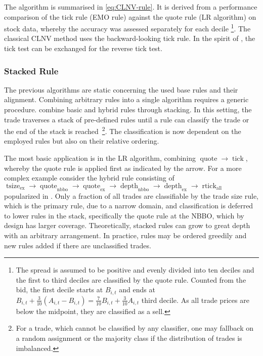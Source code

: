 The algorithm is summarised in \cref{eq:CLNV-rule}. It is derived from a performance comparison of the tick rule (\gls{EMO} rule) against the quote rule (\gls{LR} algorithm) on stock data, whereby the accuracy was assessed separately for each decile \footnote{The spread is assumed to be positive and evenly divided into ten deciles and the first to third deciles are classified by the quote rule. Counted from the bid, the first decile starts at $B_{i,t}$ and ends at $B_{i,t} + \tfrac{3}{10} (A_{i,t} - B_{i,t}) = \tfrac{7}{10} B_{i,t} + \tfrac{3}{10} A_{i,t}$ third decile. As all trade prices are below the midpoint, they are classified as a sell.}. The classical \gls{CLNV} method uses the backward-looking tick rule. In the spirit of \textcite[][735]{leeInferringTradeDirection1991}, the tick test can be exchanged for the reverse tick test.

\subsubsection{Stacked Rule}\label{sec:stacked-rule}

The previous algorithms are static concerning the used base rules and their alignment. Combining arbitrary rules into a single algorithm requires a generic procedure. \textcite[][18]{grauerOptionTradeClassification2022} combine basic and hybrid rules through stacking. In this setting, the trade traverses a stack of pre-defined rules until a rule can classify the trade or the end of the stack is reached~\footnote{For a trade, which cannot be classified by any classifier, one may fallback on a random assignment or the majority class if the distribution of trades is imbalanced.}. The classification is now dependent on the employed rules but also on their relative ordering.

The most basic application is in the \gls{LR} algorithm, combining $\operatorname{quote} \to \operatorname{tick}$, whereby the quote rule is applied first as indicated by the arrow. For a more complex example consider the hybrid rule consisting of $\operatorname{tsize}_{\mathrm{ex}} \to \operatorname{quote}_{\mathrm{nbbo}} \to \operatorname{quote}_{\mathrm{ex}} \to \operatorname{depth}_{\mathrm{nbbo}} \to \operatorname{depth}_{\mathrm{ex}} \to \operatorname{rtick}_{\mathrm{all}}$ popularized in \textcite[][18]{grauerOptionTradeClassification2022}. Only a fraction of all trades are classifiable by the trade size rule, which is the primary rule, due to a narrow domain, and classification is deferred to lower rules in the stack, specifically the quote rule at the \gls{NBBO}, which by design has larger coverage. Theoretically, stacked rules can grow to great depth with an arbitrary arrangement. In practice, rules may be ordered greedily and new rules added if there are unclassified trades.

